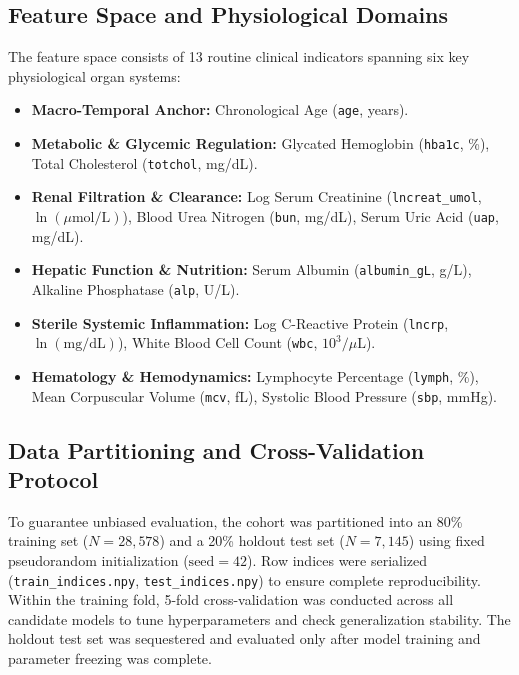 \documentclass[conference]{IEEEtran}
\begin{document}
\subsection{Feature Space and Physiological Domains}
The feature space consists of 13 routine clinical indicators spanning six key physiological organ systems:
\begin{itemize}
    \item \textbf{Macro-Temporal Anchor:} Chronological Age (\texttt{age}, years).
    \item \textbf{Metabolic \& Glycemic Regulation:} Glycated Hemoglobin (\texttt{hba1c}, \%), Total Cholesterol (\texttt{totchol}, mg/dL).
    \item \textbf{Renal Filtration \& Clearance:} Log Serum Creatinine (\texttt{lncreat\_umol}, $\ln(\mu\text{mol/L})$), Blood Urea Nitrogen (\texttt{bun}, mg/dL), Serum Uric Acid (\texttt{uap}, mg/dL).
    \item \textbf{Hepatic Function \& Nutrition:} Serum Albumin (\texttt{albumin\_gL}, g/L), Alkaline Phosphatase (\texttt{alp}, U/L).
    \item \textbf{Sterile Systemic Inflammation:} Log C-Reactive Protein (\texttt{lncrp}, $\ln(\text{mg/dL})$), White Blood Cell Count (\texttt{wbc}, $10^3/\mu\text{L}$).
    \item \textbf{Hematology \& Hemodynamics:} Lymphocyte Percentage (\texttt{lymph}, \%), Mean Corpuscular Volume (\texttt{mcv}, fL), Systolic Blood Pressure (\texttt{sbp}, mmHg).
\end{itemize}

\subsection{Data Partitioning and Cross-Validation Protocol}
To guarantee unbiased evaluation, the cohort was partitioned into an 80\% training set ($N = 28,578$) and a 20\% holdout test set ($N = 7,145$) using fixed pseudorandom initialization ($\text{seed} = 42$). Row indices were serialized (\texttt{train\_indices.npy}, \texttt{test\_indices.npy}) to ensure complete reproducibility. Within the training fold, 5-fold cross-validation was conducted across all candidate models to tune hyperparameters and check generalization stability. The holdout test set was sequestered and evaluated only after model training and parameter freezing was complete.
\end{document}
